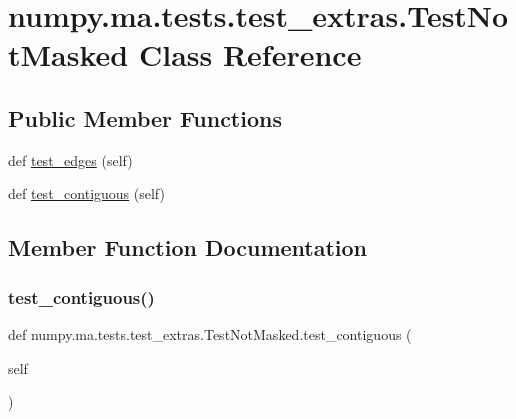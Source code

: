 \hypertarget{classnumpy_1_1ma_1_1tests_1_1test__extras_1_1TestNotMasked}{}\section{numpy.\+ma.\+tests.\+test\+\_\+extras.\+Test\+Not\+Masked Class Reference}
\label{classnumpy_1_1ma_1_1tests_1_1test__extras_1_1TestNotMasked}
\subsection*{Public Member Functions}
\begin{DoxyCompactItemize}
\item 
def \hyperlink{classnumpy_1_1ma_1_1tests_1_1test__extras_1_1TestNotMasked_a59b03943069c21284e3b4671b4129a2d}{test\+\_\+edges} (self)
\item 
def \hyperlink{classnumpy_1_1ma_1_1tests_1_1test__extras_1_1TestNotMasked_aa28f509c8ac35df65fc39a8be38e22fe}{test\+\_\+contiguous} (self)
\end{DoxyCompactItemize}


\subsection{Member Function Documentation}
\mbox{\label{classnumpy_1_1ma_1_1tests_1_1test__extras_1_1TestNotMasked_aa28f509c8ac35df65fc39a8be38e22fe}} 
\subsubsection{\texorpdfstring{test\+\_\+contiguous()}{test\_contiguous()}}
{\footnotesize\ttfamily def numpy.\+ma.\+tests.\+test\+\_\+extras.\+Test\+Not\+Masked.\+test\+\_\+contiguous (\begin{DoxyParamCaption}\item[{}]{self }\end{DoxyParamCaption})}

